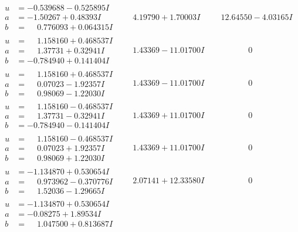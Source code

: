 \documentclass[1p]{elsarticle_modified}
\theoremstyle{definition}
\begin{document}
$$\begin{array}{c|c|c}
\begin{aligned}
u &= -0.539688 - 0.525895 I \\
a &= -1.50267 + 0.48393 I \\
b &= \phantom{-}0.776093 + 0.064315 I\end{aligned}
 & \phantom{-}4.19790 + 1.70003 I & \phantom{-}12.64550 - 4.03165 I \\ \hline\begin{aligned}
u &= \phantom{-}1.158160 + 0.468537 I \\
a &= \phantom{-}1.37731 + 0.32941 I \\
b &= -0.784940 + 0.141404 I\end{aligned}
 & \phantom{-}1.43369 - 11.01700 I & \phantom{-0.000000 } 0 \\ \hline\begin{aligned}
u &= \phantom{-}1.158160 + 0.468537 I \\
a &= \phantom{-}0.07023 - 1.92357 I \\
b &= \phantom{-}0.98069 - 1.22030 I\end{aligned}
 & \phantom{-}1.43369 - 11.01700 I & \phantom{-0.000000 } 0 \\ \hline\begin{aligned}
u &= \phantom{-}1.158160 - 0.468537 I \\
a &= \phantom{-}1.37731 - 0.32941 I \\
b &= -0.784940 - 0.141404 I\end{aligned}
 & \phantom{-}1.43369 + 11.01700 I & \phantom{-0.000000 } 0 \\ \hline\begin{aligned}
u &= \phantom{-}1.158160 - 0.468537 I \\
a &= \phantom{-}0.07023 + 1.92357 I \\
b &= \phantom{-}0.98069 + 1.22030 I\end{aligned}
 & \phantom{-}1.43369 + 11.01700 I & \phantom{-0.000000 } 0 \\ \hline\begin{aligned}
u &= -1.134870 + 0.530654 I \\
a &= \phantom{-}0.973962 - 0.370776 I \\
b &= \phantom{-}1.52036 - 1.29665 I\end{aligned}
 & \phantom{-}2.07141 + 12.33580 I & \phantom{-0.000000 } 0 \\ \hline\begin{aligned}
u &= -1.134870 + 0.530654 I \\
a &= -0.08275 + 1.89534 I \\
b &= \phantom{-}1.047500 + 0.813687 I\end{aligned}

\end{array}$$
\end{document}
